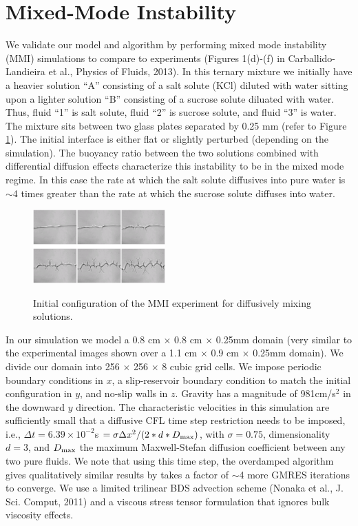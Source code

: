 \documentclass[final]{siamltex}
\begin{document}
\section{Mixed-Mode Instability}
We validate our model and algorithm by performing mixed mode instability (MMI) simulations to compare to experiments 
(Figures 1(d)-(f) in Carballido-Landieira et al., Physics of Fluids, 2013).  In this ternary mixture
we initially have a heavier solution ``A'' consisting of a salt solute (KCl) diluted with water sitting upon
a lighter solution ``B'' consisting of a sucrose solute diluated with water.  
Thus, fluid ``1'' is salt solute, fluid ``2'' is sucrose solute, and fluid ``3'' is water.
The mixture sits between two glass plates separated by 0.25 mm (refer to Figure \ref{fig:mmi}).
The initial interface is either flat or slightly perturbed (depending
on the simulation).  The buoyancy ratio between the two solutions combined with 
differential diffusion effects characterize this instability to be in the mixed mode
regime.  In this case the rate at which the salt solute diffusives into pure water is $\sim$4 times greater 
than the rate at which the sucrose solute diffuses into water.
\begin{figure}[hb]
\centering
\includegraphics[width=2in]{mmi}
\label{fig:mmi}
\caption{Initial configuration of the MMI experiment for diffusively mixing solutions.}
\end{figure}

In our simulation we model a 0.8 cm $\times$ 0.8 cm $\times$ 0.25mm domain (very similar to the experimental
images shown over a 1.1 cm $\times$ 0.9 cm $\times$ 0.25mm domain).  We divide our domain into 
256 $\times$ 256 $\times$ 8 cubic grid cells.  We impose periodic boundary conditions in $x$,
a slip-reservoir boundary condition to match the initial configuration in $y$, and no-slip walls in $z$.
Gravity has a magnitude of 981cm/s$^2$ in the downward $y$ direction.  The characteristic velocities in
this simulation are sufficiently small that a diffusive CFL time step restriction needs to be imposed, i.e.,
$\Delta t = 6.39 \times 10^{-2}$s $= \sigma\Delta x^2/(2*d*D_{\rm max})$, with $\sigma=0.75$, 
dimensionality $d=3$, and $D_{\rm max}$ the maximum Maxwell-Stefan diffusion coefficient between any two pure
fluids.  We note that using this time step, the overdamped algorithm gives qualitatively
similar results by takes a factor of $\sim$4 more GMRES iterations to converge.  We use a limited trilinear
BDS advection scheme (Nonaka et al., J. Sci. Comput, 2011) and a viscous stress tensor formulation that 
ignores bulk viscosity effects.
\end{document}

